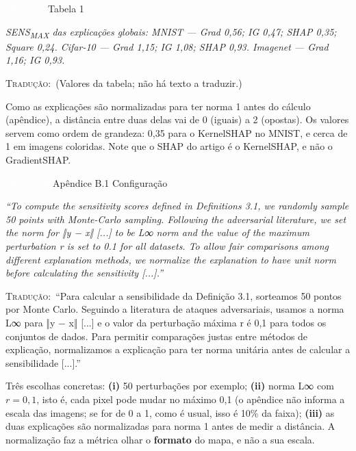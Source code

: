 \documentclass[11pt,a4paper]{article}
\newcommand{\pagechip}[1]{{\setlength{\fboxsep}{1.5pt}\colorbox{cAcc}{\textcolor{white}{\scriptsize\texttt{#1}}}}}
\newenvironment{origquote}{\par\itshape\small}{\par}
\newenvironment{tradquote}{\par\small\textsc{Tradução:}\ }{\par}
\newcommand{\explab}[1]{\par\smallskip{\small\color{cAcc}\textbf{\MakeUppercase{#1}}}\par}
\begin{document}
\begin{citacard}{\pagechip{Yeh p. 7} Tabela 1}
\begin{origquote}SENS\textsubscript{MAX} das explicações globais: MNIST — Grad 0,56; IG 0,47; SHAP 0,35; Square 0,24. Cifar-10 — Grad 1,15; IG 1,08; SHAP 0,93. Imagenet — Grad 1,16; IG 0,93.\end{origquote}
\begin{tradquote}(Valores da tabela; não há texto a traduzir.)\end{tradquote}
\explab{Explicação}
Como as explicações são normalizadas para ter norma 1 antes do cálculo (apêndice), a distância entre duas delas vai de 0 (iguais) a 2 (opostas). Os valores servem como ordem de grandeza: 0,35 para o KernelSHAP no MNIST, e cerca de 1 em imagens coloridas. Note que o SHAP do artigo é o KernelSHAP, e não o GradientSHAP.
\end{citacard}

\begin{citacard}{\pagechip{Yeh p. 16} Apêndice B.1 Configuração}
\begin{origquote}“To compute the sensitivity scores defined in Definitions 3.1, we randomly sample 50 points with Monte-Carlo sampling. Following the adversarial literature, we set the norm for ‖y − x‖ [...] to be L∞ norm and the value of the maximum perturbation r is set to 0.1 for all datasets. To allow fair comparisons among different explanation methods, we normalize the explanation to have unit norm before calculating the sensitivity [...].”\end{origquote}
\begin{tradquote}“Para calcular a sensibilidade da Definição 3.1, sorteamos 50 pontos por Monte Carlo. Seguindo a literatura de ataques adversariais, usamos a norma L∞ para ‖y − x‖ [...] e o valor da perturbação máxima r é 0,1 para todos os conjuntos de dados. Para permitir comparações justas entre métodos de explicação, normalizamos a explicação para ter norma unitária antes de calcular a sensibilidade [...].”\end{tradquote}
\explab{Explicação}
Três escolhas concretas: \textbf{(i)} 50 perturbações por exemplo; \textbf{(ii)} norma L∞ com $r = 0{,}1$, isto é, cada pixel pode mudar no máximo 0,1 (o apêndice não informa a escala das imagens; se for de 0 a 1, como é usual, isso é 10\% da faixa); \textbf{(iii)} as duas explicações são normalizadas para norma 1 antes de medir a distância. A normalização faz a métrica olhar o \textbf{formato} do mapa, e não a sua escala.
\end{citacard}
\end{document}
